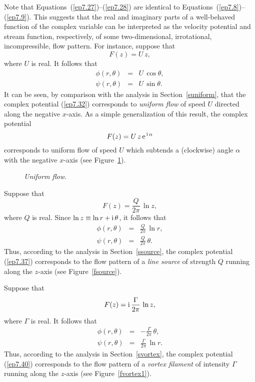 Note that Equations~(\ref{ep7.27})--(\ref{ep7.28}) are identical to Equations~(\ref{ep7.8})--(\ref{ep7.9}).
This suggests that the real and imaginary parts of a well-behaved function of the complex variable
can be interpreted as the velocity potential and stream function, respectively, of some two-dimensional,
irrotational, incompressible, flow pattern. For instance,
suppose that
\begin{equation}\label{ep7.32}
F(z)=U\,z,
\end{equation}
where $U$ is real.  It
follows that
\begin{eqnarray}
\phi (r,\theta)&=&U\,\cos\theta,\\[0.5ex]
\psi(r,\theta)&=&U\,\sin\theta.
\end{eqnarray}
It can be seen, by comparison with the analysis in Section~\ref{suniform}, that the complex potential (\ref{ep7.32}) corresponds to {\em uniform flow}\/ of speed $U$ directed along the negative $x$-axis. 
As a simple generalization of this result, the complex potential
\begin{equation}
F(z) = U\,z\,{\rm e}^{\,{\rm i}\,\alpha}
\end{equation}
corresponds to uniform flow of speed $U$ which subtends a (clockwise) angle $\alpha$ with the negative $x$-axis (see Figure~\ref{funi}).

\begin{figure}
\epsfysize=3in
\centerline{}
\caption{\em Uniform flow.}\label{funi}
\end{figure}

Suppose that
\begin{equation}\label{ep7.37}
F(z)= \frac{Q}{2\pi}\,\ln z,
\end{equation}
where $Q$ is real.
Since $\ln z \equiv \ln r + {\rm i}\,\theta$, it follows that
\begin{eqnarray}
\phi(r,\theta)&=&\frac{Q}{2\pi}\,\ln r,\\[0.5ex]
\psi(r,\theta)&=&\frac{Q}{2\pi}\,\theta.
\end{eqnarray}
Thus, according to the analysis in Section~\ref{ssource}, the complex potential (\ref{ep7.37}) corresponds
to the flow pattern of a {\em line source}\/ of strength $Q$ running along the $z$-axis (see Figure~\ref{fsource}). 

Suppose that 
\begin{equation}\label{ep7.40}
F(z) = {\rm i}\,\frac{\Gamma}{2\pi}\,\ln z,
\end{equation}
where $\Gamma$ is real. It follows that
\begin{eqnarray}
\phi(r,\theta)&=&-\frac{\Gamma}{2\pi}\,\theta,\\[0.5ex]
\psi(r,\theta)&=&\frac{\Gamma}{2\pi}\,\ln r.
\end{eqnarray}
Thus, according to the analysis in Section~\ref{svortex}, the complex potential (\ref{ep7.40}) corresponds
to the flow pattern of a {\em vortex filament}\/ of intensity  $\Gamma$ running along the $z$-axis (see Figure~\ref{fvortex1}). 

